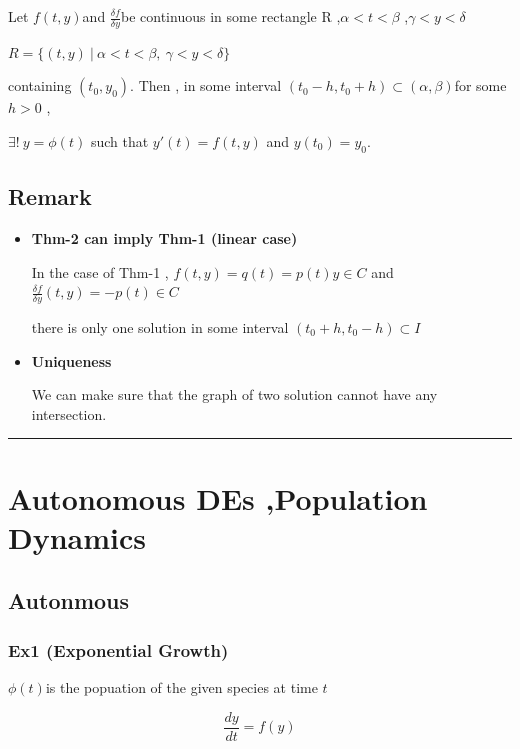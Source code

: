 \documentclass[12pt, a4paper]{article}
\theoremstyle{break}
\begin{document}
Let \(f (t ,y)\)and \(\frac{\delta f}{\delta y}\)be continuous in some rectangle R ,\(\alpha < t <\beta\) ,\(\gamma < y < \delta\)

\(R = \{ (t, y)\  | \ \alpha < t < \beta  ,\ \gamma < y < \delta \}\)

containing \((t_0 ,y_0)\). Then , in some interval \((t_0 -h , t_0 + h) \subset (\alpha ,\beta)\)for some \(h > 0\) ,

\(\exists!\ y = \phi(t)\) such that \(y'(t) = f(t,y)\) and \(y(t_0) = y_0\).

\subsection{Remark}\label{remark}

\begin{itemize}
\item
  \textbf{Thm-2 can imply Thm-1 (linear case)}

  In the case of Thm-1 , \(f(t ,y) = q(t) = p(t)y \in C\) and \(\frac{\delta f}{\delta y}(t ,y) = -p(t) \in C\)

  there is only one solution in some interval \((t_0 +h ,t_0 - h) \subset I\)
\item
  \textbf{Uniqueness}

  We can make sure that the graph of two solution cannot have any intersection.
\end{itemize}

\begin{center}\rule{0.5\linewidth}{0.5pt}\end{center}

\section{Autonomous DEs ,Population Dynamics}\label{autonomous-des-population-dynamics}

\subsection{Autonmous}\label{autonmous}

\subsubsection{Ex1 (Exponential Growth)}\label{ex1-exponential-growth}

\(\phi (t)\)is the popuation of the given species at time \(t\)

\[
\frac{dy}{dt} = f(y)
\]
\end{document}
